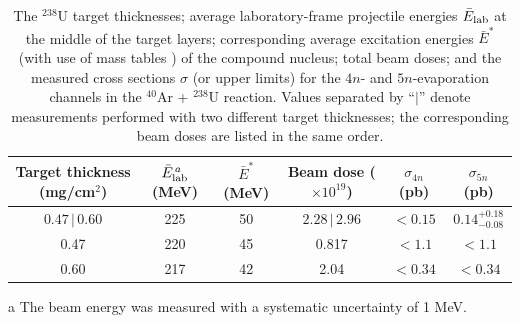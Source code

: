 \documentclass[final,5p,times,twocolumn,number,sort&compress]{elsarticle}
\begin{document}
\begin{table}[htbp]
\centering
\captionsetup{font=small}
\caption{The $^{238}$U target thicknesses; average laboratory-frame projectile energies $\bar{E}_{\rm lab}$ at the middle of the target layers; corresponding average excitation energies $\bar{E}^{*}$ (with use of mass tables \cite{myers1996NuclearPropertiesAccording,wang2021NUBASE2020EvaluationNuclear} ) of the compound nucleus; total beam doses; and the measured cross sections $\sigma$ (or upper limits) for the $4n$- and $5n$-evaporation channels in the $^{40}$Ar + $^{238}$U reaction.
Values separated by ``$|$'' denote measurements performed with two different target thicknesses; the corresponding beam doses are listed in the same order.}
\label{tab:cross_sections}

\begin{threeparttable}
\setlength{\tabcolsep}{3.5pt}      %
\renewcommand{\arraystretch}{1.08} %
\small

\begin{tabular*}{\columnwidth}{@{\extracolsep{\fill}}cccccc@{}}
\toprule
\makecell[c]{Target thickness\\(mg/cm$^{2}$)} &
\makecell[c]{$\bar{E}_{\rm lab}^{\,a}$\\(MeV)} &
\makecell[c]{$\bar{E}^{*}$\\(MeV)} &
\makecell[c]{Beam dose\\($\times 10^{19}$)} &
\makecell[c]{$\sigma_{4n}$\\(pb)} &
\makecell[c]{$\sigma_{5n}$\\(pb)} \\
\midrule
$0.47\,|\,0.60$ & 225 & 50 & $2.28\,|\,2.96$ & $<0.15$ & $0.14^{+0.18}_{-0.08}$ \\
0.47            & 220 & 45 & 0.817           & $<1.1$  & $<1.1$ \\
0.60            & 217 & 42 & 2.04            & $<0.34$ & $<0.34$ \\
\bottomrule
\end{tabular*}

\begin{tablenotes}[flushleft]
\footnotesize
\item[a] The beam energy was measured with a systematic uncertainty of 1 MeV.
\end{tablenotes}
\end{threeparttable}
\end{table}
\end{document}
